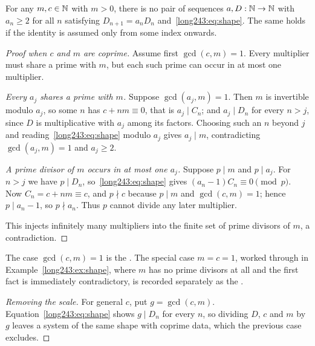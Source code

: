 \documentclass[11pt]{article}
\begin{document}
\begin{theorem}\label{long243:res:constant}
For any $m,c\in\mathbb{N}$ with $m>0$, there is no pair of sequences
$a,D:\mathbb{N}\to\mathbb{N}$ with $a_n\ge2$ for all $n$ satisfying
$D_{n+1}=a_nD_n$ and~\eqref{long243:eq:shape}. The same holds if the
identity is assumed only from some index onwards.
\end{theorem}

\begin{proof}[Proof when $c$ and $m$ are coprime]
Assume first $\gcd(c,m)=1$. Every multiplier must share a prime with
$m$, but each such prime can occur in at most one multiplier.

\emph{Every $a_j$ shares a prime with $m$.}  Suppose $\gcd(a_j,m)=1$.  Then
$m$ is invertible modulo $a_j$, so some $n$ has $c+nm\equiv0$, that is
$a_j\mid C_n$; and $a_j\mid D_n$ for every $n>j$, since $D$ is multiplicative
with $a_j$ among its factors.  Choosing such an $n$ beyond $j$
and reading~\eqref{long243:eq:shape} modulo $a_j$ gives $a_j\mid m$, contradicting
$\gcd(a_j,m)=1$ and $a_j\ge2$.

\emph{A prime divisor of $m$ occurs in at most one $a_j$.}  Suppose $p\mid m$
and $p\mid a_j$.  For $n>j$ we have $p\mid D_n$, so~\eqref{long243:eq:shape} gives
$(a_n-1)C_n\equiv0 \pmod p$.  Now $C_n=c+nm\equiv c$, and $p\nmid c$ because
$p\mid m$ and $\gcd(c,m)=1$; hence $p\mid a_n-1$, so $p\nmid a_n$.  Thus $p$
cannot divide any later multiplier.

This injects infinitely many multipliers into the finite set of prime
divisors of $m$, a contradiction.
\end{proof}

\noindent The case $\gcd(c,m)=1$ is the
.  The special case $m=c=1$, worked through in
Example~\ref{long243:ex:shape}, where $m$ has no prime divisors at all and the first
fact is immediately contradictory, is recorded separately as the
.

\begin{proof}[Removing the scale]
For general $c$, put $g=\gcd(c,m)$.  Equation~\eqref{long243:eq:shape} shows
$g\mid D_n$ for every $n$, so dividing $D$, $c$ and $m$ by $g$ leaves a system
of the same shape with coprime data, which the previous case excludes.
\end{proof}
\end{document}
